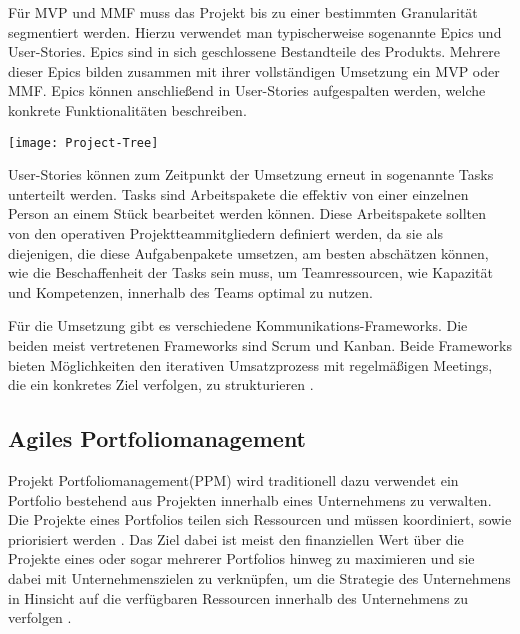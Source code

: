 Für MVP und MMF muss das Projekt bis zu einer bestimmten Granularität segmentiert werden. Hierzu verwendet man typischerweise sogenannte Epics und User-Stories. Epics sind in sich geschlossene Bestandteile des Produkts. Mehrere dieser Epics bilden zusammen mit ihrer vollständigen Umsetzung ein MVP oder MMF. Epics können anschließend in User-Stories aufgespalten werden, welche konkrete Funktionalitäten beschreiben. \cite{agilesProjektmanagementImBerufsalltagEpicsUndUserStories}

\vspace{20pt}
\begin{center}
    \begin{minipage}{0.8\linewidth}
        \texttt{[image: Project-Tree]}
    \end{minipage}
\end{center}
\vspace{20pt}

User-Stories können zum Zeitpunkt der Umsetzung erneut in sogenannte Tasks unterteilt werden. Tasks sind Arbeitspakete die effektiv von einer einzelnen Person an einem Stück bearbeitet werden können. Diese Arbeitspakete sollten von den operativen Projektteammitgliedern definiert werden, da sie als diejenigen, die diese Aufgabenpakete umsetzen, am besten abschätzen können, wie die Beschaffenheit der Tasks sein muss, um Teamressourcen, wie Kapazität und Kompetenzen, innerhalb des Teams optimal zu nutzen. \cite{agilesProjektmanagementImBerufsalltagEpicsUndUserStories}

Für die Umsetzung gibt es verschiedene Kommunikations-Frameworks. Die beiden meist vertretenen Frameworks sind Scrum und Kanban. Beide Frameworks bieten Möglichkeiten den iterativen Umsatzprozess mit regelmäßigen Meetings, die ein konkretes Ziel verfolgen, zu strukturieren \cite{}.

\subsection{Agiles Portfoliomanagement}
Projekt Portfoliomanagement(PPM) wird traditionell dazu verwendet ein Portfolio bestehend aus Projekten innerhalb eines Unternehmens zu verwalten. Die Projekte eines Portfolios teilen sich Ressourcen und müssen koordiniert, sowie priorisiert werden \cite{NGUYEN20181054}.
Das Ziel dabei ist meist den finanziellen Wert über die Projekte eines oder sogar mehrerer Portfolios hinweg zu maximieren und sie dabei mit Unternehmenszielen zu verknüpfen, um die Strategie des Unternehmens in Hinsicht auf die verfügbaren Ressourcen innerhalb des Unternehmens zu verfolgen \cite{MARTINSUO200756}.

